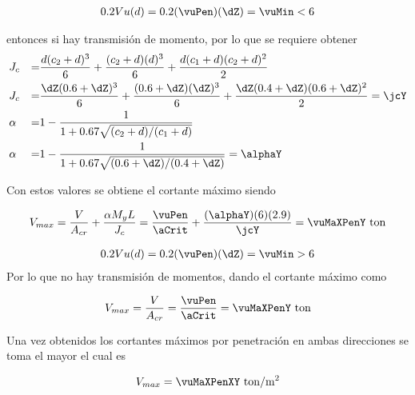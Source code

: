 \documentclass[11pt,a4paper,fleqn]{article}
\begin{document}
\FPifgt \myZ \vuMin  {} \else {} \fi
{}
	{
	\begin{align*}
		0.2Vu(d)=0.2(\vuPen)(\dZ)=\vuMin<\myZ 
	\end{align*}

entonces si hay transmisión de momento, por lo que se requiere obtener 
	\begin{align*}
		&J_c&=&\frac{d(c_2+d)^3}{6}+\frac{(c_2+d)(d)^3}{6}+\frac{d(c_1+d)(c_2+d)^2}{2}\\
		&J_c&=&\frac{\dZ(\cbZ+\dZ)^3}{6}+\frac{(\cbZ+\dZ)(\dZ)^3}{6}+\frac{\dZ(\caZ+\dZ)(\cbZ+\dZ)^2}{2}=\jcY\\
		&\alpha&=&1-\frac{1}{1+0.67\sqrt{(c_2+d)/(c_1+d)}}\\
		&\alpha&=&1-\frac{1}{1+0.67\sqrt{(\cbZ+\dZ)/(\caZ+\dZ)}}=\alphaY
	\end{align*}
	
	Con estos valores se obtiene el cortante máximo siendo
	
	\begin{align*}
		V_{max}=\frac{V}{A_{cr}}+\frac{\alpha M_y L}{J_c}=\frac{\vuPen}{\aCrit}+\frac{(\alphaY)(\myZ)(\lZ)}{\jcY}=\vuMaXPenY \text{ ton}
	\end{align*}
	} 
	{
	\begin{align*}
		0.2Vu(d)=0.2(\vuPen)(\dZ)=\vuMin>\myZ 
	\end{align*}
	Por lo que no hay transmisión de momentos, dando el cortante máximo como
	
	
	\begin{align*}
		V_{max}=\frac{V}{A_{cr}}=\frac{\vuPen}{\aCrit}=\vuMaXPenY \text{ ton}
	\end{align*}
  }


Una vez obtenidos los cortantes máximos por penetración en ambas direcciones se toma el mayor el cual es

\begin{align*}
		V_{max}=\vuMaXPenXY \text{ ton/m$^2$}
	\end{align*}
\end{document}

